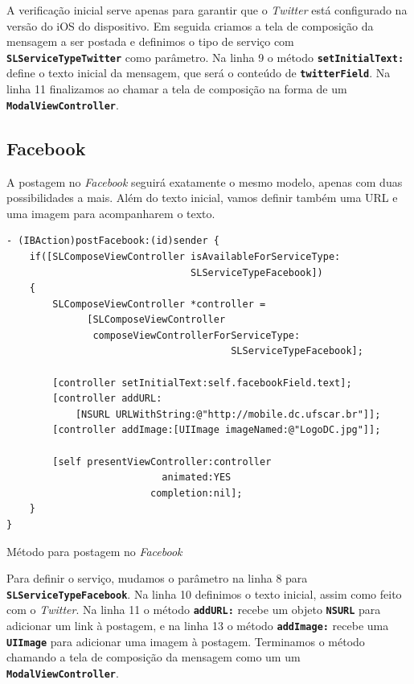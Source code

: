 \documentclass[a4paper,12pt,brazil,oneside]{book}
\begin{document}
A verificação inicial serve apenas para garantir que o \emph{Twitter} está configurado na versão do iOS do dispositivo. Em seguida criamos a tela de composição da mensagem a ser postada e definimos o tipo de serviço com \texttt{\textbf{SLServiceTypeTwitter}} como parâmetro. Na linha 9 o método \texttt{\textbf{setInitialText:}} define o texto inicial da mensagem, que será o conteúdo de \texttt{\textbf{twitterField}}. Na linha 11 finalizamos ao chamar a tela de composição na forma de um \texttt{\textbf{ModalViewController}}.

\subsection{Facebook}


A postagem no \emph{Facebook} seguirá exatamente o mesmo modelo, apenas com duas possibilidades a mais. Além do texto inicial, vamos definir também uma URL e uma imagem para acompanharem o texto.

\begin{listing}[H]
\begin{verbatim}
- (IBAction)postFacebook:(id)sender {
    if([SLComposeViewController isAvailableForServiceType:
                                SLServiceTypeFacebook])
    {
        SLComposeViewController *controller =
              [SLComposeViewController
               composeViewControllerForServiceType:
                                       SLServiceTypeFacebook];
        
        [controller setInitialText:self.facebookField.text];
        [controller addURL:
            [NSURL URLWithString:@"http://mobile.dc.ufscar.br"]];
        [controller addImage:[UIImage imageNamed:@"LogoDC.jpg"]];

        [self presentViewController:controller
                           animated:YES
                         completion:nil];
    }
}
\end{verbatim}
\caption{Método para postagem no \emph{Facebook}}
\end{listing}


Para definir o serviço, mudamos o parâmetro na linha 8 para \texttt{\textbf{SLServiceTypeFacebook}}. Na linha 10 definimos o texto inicial, assim como feito com o \emph{Twitter}. Na linha 11 o método \texttt{\textbf{addURL:}} recebe um objeto \texttt{\textbf{NSURL}} para adicionar um link à postagem, e na linha 13 o método \texttt{\textbf{addImage:}} recebe uma \texttt{\textbf{UIImage}} para adicionar uma imagem à postagem. Terminamos o método chamando a tela de composição da mensagem como um um \texttt{\textbf{ModalViewController}}.
\end{document}
